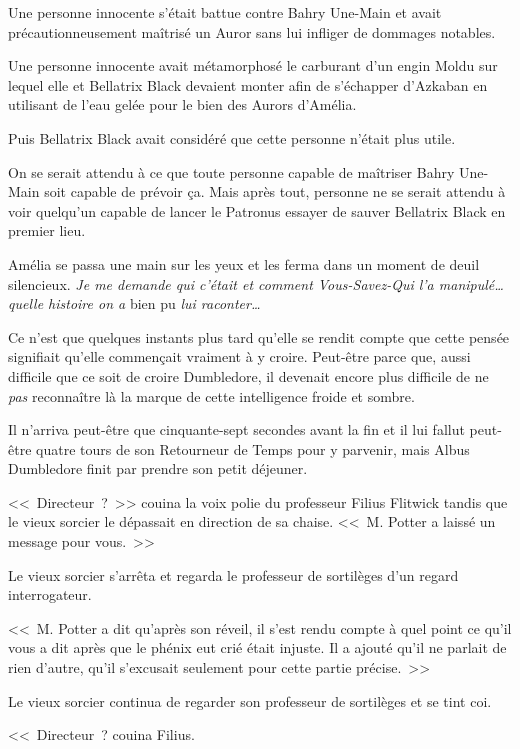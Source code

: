 Une personne innocente s'était battue contre Bahry Une-Main et avait précautionneusement maîtrisé un Auror sans lui infliger de dommages notables.

Une personne innocente avait métamorphosé le carburant d'un engin Moldu sur lequel elle et Bellatrix Black devaient monter afin de s'échapper d'Azkaban en utilisant de l'eau gelée pour le bien des Aurors d'Amélia.

Puis Bellatrix Black avait considéré que cette personne n'était plus utile.

On se serait attendu à ce que toute personne capable de maîtriser Bahry Une-Main soit capable de prévoir ça. Mais après tout, personne ne se serait attendu à voir quelqu'un capable de lancer le Patronus essayer de sauver Bellatrix Black en premier lieu.

Amélia se passa une main sur les yeux et les ferma dans un moment de deuil silencieux. \emph{Je me demande qui c'était et comment Vous-Savez-Qui l'a manipulé… quelle histoire on a} bien pu \emph{lui raconter…}

Ce n'est que quelques instants plus tard qu'elle se rendit compte que cette pensée signifiait qu'elle commençait vraiment à y croire. Peut-être parce que, aussi difficile que ce soit de croire Dumbledore, il devenait encore plus difficile de ne \emph{pas} reconnaître là la marque de cette intelligence froide et sombre.


Il n'arriva peut-être que cinquante-sept secondes avant la fin et il lui fallut peut-être quatre tours de son Retourneur de Temps pour y parvenir, mais Albus Dumbledore finit par prendre son petit déjeuner.

<<~Directeur~?~>> couina la voix polie du professeur Filius Flitwick tandis que le vieux sorcier le dépassait en direction de sa chaise. <<~M. Potter a laissé un message pour vous.~>>

Le vieux sorcier s'arrêta et regarda le professeur de sortilèges d'un regard interrogateur.

<<~M. Potter a dit qu'après son réveil, il s'est rendu compte à quel point ce qu'il vous a dit après que le phénix eut crié était injuste. Il a ajouté qu'il ne parlait de rien d'autre, qu'il s'excusait seulement pour cette partie précise.~>>

Le vieux sorcier continua de regarder son professeur de sortilèges et se tint coi.

<<~Directeur~? couina Filius.

